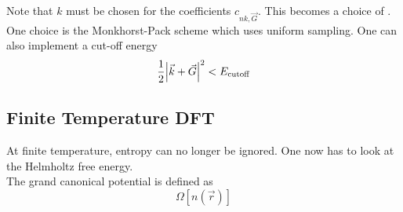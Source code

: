 \documentclass[12pt,a4paper,titlepage]{article}
\newcommand{\trm}[1]{\textrm{#1}} %
\newcommand{\ul}[1]{\underline{\smash{#1}}} %
\begin{document}
Note that $k$ must be chosen for the coefficients $c_{nk,\vec{G}}$. This becomes a choice of \ul{$k$-point sampling}. One choice is the Monkhorst-Pack scheme which uses uniform sampling. One can also implement a cut-off energy
\begin{equation}
\frac{1}{2}\abs{\vec{k}+\vec{G}}^{2}<E_{\trm{cutoff}}
\end{equation}

\begin{center}
\end{center}

\subsection{Finite Temperature DFT}
At finite temperature, entropy can no longer be ignored. One now has to look at the Helmholtz free energy.\\

The grand canonical potential is defined as
\begin{equation}
\Omega[n(\vec{r})]
\end{equation}
\end{document}
